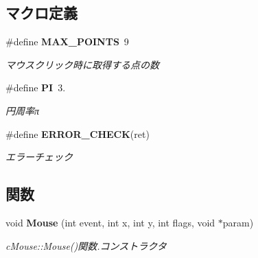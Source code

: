 \subsection*{マクロ定義}
\begin{DoxyCompactItemize}
\item 
\#define {\bf M\-A\-X\-\_\-\-P\-O\-I\-N\-T\-S}~9
\begin{DoxyCompactList}\small\item\em マウスクリック時に取得する点の数 \end{DoxyCompactList}\item 
\#define {\bf P\-I}~3.
\begin{DoxyCompactList}\small\item\em 円周率π \end{DoxyCompactList}\item 
\#define {\bf E\-R\-R\-O\-R\-\_\-\-C\-H\-E\-C\-K}(ret)
\begin{DoxyCompactList}\small\item\em エラーチェック \end{DoxyCompactList}\end{DoxyCompactItemize}
\subsection*{関数}
\begin{DoxyCompactItemize}
\item 
void {\bf Mouse} (int event, int x, int y, int flags, void $\ast$param)
\begin{DoxyCompactList}\small\item\em c\-Mouse\-::\-Mouse()関数.\-コンストラクタ \end{DoxyCompactList}\end{DoxyCompactItemize}

